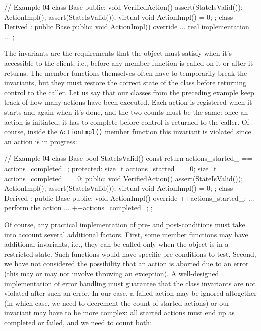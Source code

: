 \begin{code}
// Example 04
class Base {
  public:
  void VerifiedAction() {
    assert(StateIsValid());
    ActionImpl();
    assert(StateIsValid());
  }
  virtual void ActionImpl() = 0;
};
class Derived : public Base {
  public:
  void ActionImpl() override { ... real implementation ...}
};
\end{code}

The invariants are the requirements that the object must satisfy when it's accessible to the client, i.e., before any member function is called on it or after it returns. The member functions themselves often have to temporarily break the invariants, but they must restore the correct state of the class before returning control to the caller. Let us say that our classes from the preceding example keep track of how many actions have been executed. Each action is registered when it starts and again when it's done, and the two counts must be the same: once an action is initiated, it has to complete before control is returned to the caller. Of course, inside the \texttt{ActionImpl()} member function this invariant is violated since an action is in progress:

\begin{code}
// Example 04
class Base {
  bool StateIsValid() const {
    return actions_started_ == actions_completed_;
  }
  protected:
  size_t actions_started_ = 0;
  size_t actions_completed_ = 0;
  public:
  void VerifiedAction() {
    assert(StateIsValid());
    ActionImpl();
    assert(StateIsValid());
  }
  virtual void ActionImpl() = 0;
};
class Derived : public Base {
  public:
  void ActionImpl() override {
    ++actions_started_;
    ... perform the action ...
    ++actions_completed_;
  }
};
\end{code}

Of course, any practical implementation of pre- and post-conditions must take into account several additional factors. First, some member functions may have additional invariants, i.e., they can be called only when the object is in a restricted state. Such functions would have specific pre-conditions to test. Second, we have not considered the possibility that an action is aborted due to an error (this may or may not involve throwing an exception). A well-designed implementation of error handling must guarantee that the class invariants are not violated after such an error. In our case, a failed action may be ignored altogether (in which case, we need to decrement the count of started actions) or our invariant may have to be more complex: all started actions must end up as completed or failed, and we need to count both:

